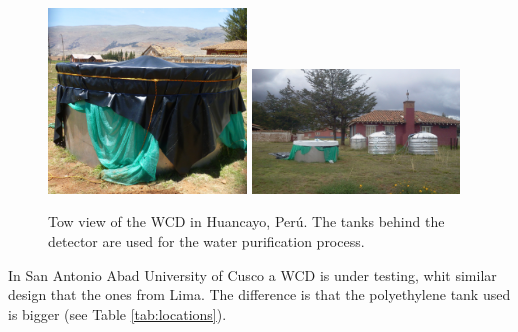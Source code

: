 \begin{figure}[h!]
\begin{center}
\includegraphics[width=0.47\textwidth]{images/peru/WCD_Huancayo.JPG}
\includegraphics[width=0.49\textwidth]{images/peru/detectores-peru.jpg}
\caption{Tow view of the WCD in Huancayo, Perú. The tanks behind the detector are used for the water purification process.}
\label{fig:peru-site}
\end{center}
\end{figure}

In San Antonio Abad University of Cusco a WCD is under testing, whit similar
design that the ones from Lima. The difference is that the polyethylene tank
used is bigger (see Table \ref{tab:locations}).
